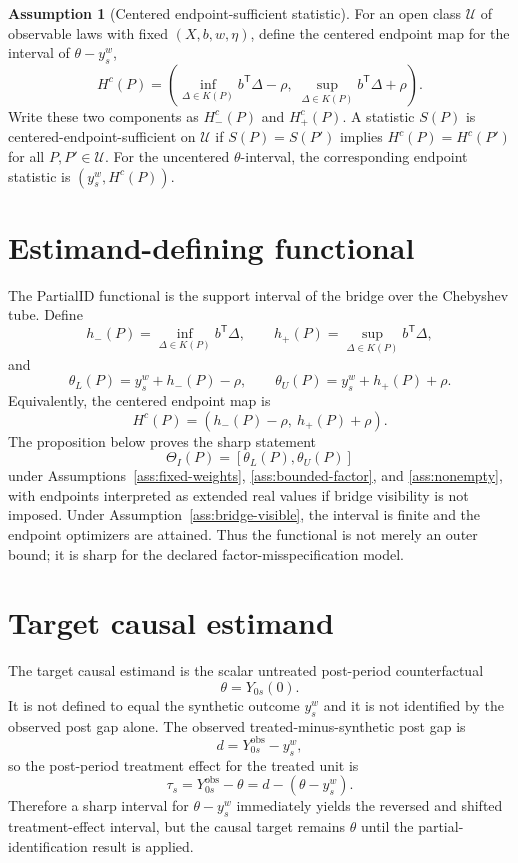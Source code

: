 \documentclass[11pt]{article}
\newcommand{\transpose}{\mathsf{T}}
\theoremstyle{definition}
\newtheorem{assumption}{Assumption}
\theoremstyle{plain}
\theoremstyle{remark}
\begin{document}
\begin{assumption}[Centered endpoint-sufficient statistic]\label{ass:endpoint-sufficient}
For an open class \(\mathcal U\) of observable laws with fixed
\((X,b,w,\eta)\), define the centered endpoint map for the interval of
\(\theta-y_s^w\),
\[
H^c(P)=\left(
\inf_{\Delta\in K(P)}b^\transpose\Delta-\rho,\;
\sup_{\Delta\in K(P)}b^\transpose\Delta+\rho
\right).
\]
Write these two components as \(H^c_-(P)\) and \(H^c_+(P)\).  A statistic
\(S(P)\) is centered-endpoint-sufficient on \(\mathcal U\) if
\(S(P)=S(P')\) implies \(H^c(P)=H^c(P')\) for all
\(P,P'\in\mathcal U\).  For the uncentered \(\theta\)-interval, the
corresponding endpoint statistic is \((y_s^w,H^c(P))\).
\end{assumption}

\section{Estimand-defining functional}
The PartialID functional is the support interval of the bridge over the
Chebyshev tube.  Define
\[
h_-(P)=\inf_{\Delta\in K(P)}b^\transpose\Delta,\qquad
h_+(P)=\sup_{\Delta\in K(P)}b^\transpose\Delta,
\]
and
\[
\theta_L(P)=y_s^w+h_-(P)-\rho,\qquad
\theta_U(P)=y_s^w+h_+(P)+\rho.
\]
Equivalently, the centered endpoint map is
\[
H^c(P)=(h_-(P)-\rho,\ h_+(P)+\rho).
\]
The proposition below proves the sharp statement
\[
\Theta_I(P)=[\theta_L(P),\theta_U(P)]
\]
under Assumptions~\ref{ass:fixed-weights}, \ref{ass:bounded-factor}, and
\ref{ass:nonempty}, with endpoints interpreted as extended real values if
bridge visibility is not imposed.  Under Assumption~\ref{ass:bridge-visible},
the interval is finite and the endpoint optimizers are attained.  Thus the
functional is not merely an outer bound; it is sharp for the declared
factor-misspecification model.

\section{Target causal estimand}
The target causal estimand is the scalar untreated post-period counterfactual
\[
\theta=Y_{0s}(0).
\]
It is not defined to equal the synthetic outcome \(y_s^w\) and it is not
identified by the observed post gap alone.  The observed treated-minus-synthetic
post gap is
\[
d=Y_{0s}^{\mathrm{obs}}-y_s^w,
\]
so the post-period treatment effect for the treated unit is
\[
\tau_s=Y_{0s}^{\mathrm{obs}}-\theta
      =d-(\theta-y_s^w).
\]
Therefore a sharp interval for \(\theta-y_s^w\) immediately yields the
reversed and shifted treatment-effect interval, but the causal target remains
\(\theta\) until the partial-identification result is applied.
\end{document}
